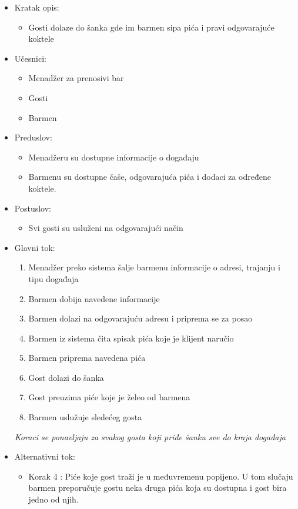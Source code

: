 \documentclass[a4paper]{article}
\begin{document}
\begin{itemize}
    \item Kratak opis:
        \begin{itemize}
            \item Gosti dolaze do šanka gde im barmen sipa pića i pravi odgovarajuće koktele 
        \end{itemize}
    \item Učesnici:
        \begin{itemize}
            \item Menadžer za prenosivi bar
            \item Gosti
            \item Barmen
        \end{itemize}
    \item Preduslov:
        \begin{itemize}
            \item Menadžeru su dostupne informacije o događaju
            \item Barmenu su dostupne čaše, odgovarajuća 
		    pića i dodaci za određene koktele.
        \end{itemize}
    \item Postuslov:
        \begin{itemize}
            \item Svi gosti su usluženi na odgovarajući način
        \end{itemize}
    \item Glavni tok:
        \begin{enumerate}
            \item Menadžer preko sistema šalje barmenu informacije o adresi, trajanju i tipu događaja
            \item Barmen dobija navedene informacije
            \item Barmen dolazi na odgovarajuću adresu i priprema se za posao
            \item Barmen iz sistema čita spisak pića koje je klijent naručio
            \item Barmen priprema navedena pića
           \item Gost dolazi do šanka
		   \item Gost preuzima piće koje je želeo od barmena
		   \item Barmen uslužuje sledećeg gosta
		  \end{enumerate}
		\textit{Koraci se ponavljaju za svakog gosta koji priđe šanku sve do kraja događaja}
	
    \item Alternativni tok:
        \begin{itemize}
	      \item	Korak 4 : Piće koje gost traži je u međuvremenu popijeno. U tom slučaju barmen preporučuje gostu neka druga pića koja su dostupna i gost bira jedno od njih.

        \end{itemize}
\end{itemize}
\end{document}
